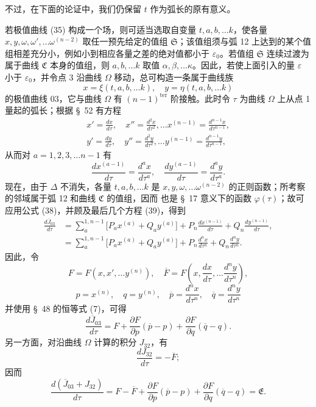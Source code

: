 \documentclass[11pt,a4paper,leqno]{article}
\begin{document}
不过，在下面的论证中，我们仍保留 $t$ 作为弧长的原有意义。

若极值曲线 (35) 构成一个场，则可适当选取自变量 $t,a,b,\ldots k$，使各量 $x,y,\omega,\omega',\ldots\omega^{(n-2)}$ 取任一预先给定的值组 $\mathfrak{S}$；该值组须与弧 12 上达到的某个值组相差充分小，例如小到相应各量之差的绝对值都小于 $\varepsilon_0$。若值组 $\mathfrak{S}$ 连续过渡为属于曲线 $\mathfrak{C}$ 本身的值组，则 $a,b,\ldots k$ 取值 $\alpha,\beta,\ldots\kappa$。因此，若使上面引入的量 $\varepsilon$ 小于 $\varepsilon_0$，并令点 3 沿曲线 $\Omega$ 移动，总可构造一条属于曲线族
\[
x=\xi(t,a,b,\ldots k),\quad y=\eta(t,a,b,\ldots k)
\]
的极值曲线 03，它与曲线 $\Omega$ 有 $(n-1)^{\mathrm{ter}}$ 阶接触。此时令 $\tau$ 为曲线 $\Omega$ 上从点 1 量起的弧长；根据 \S~52 有方程
\begin{equation}\tag{39}
\begin{gathered}
x'=\frac{dx}{d\tau},\quad x''=\frac{d^2x}{d\tau^2},\ldots
x^{(n-1)}=\frac{d^{n-1}x}{d\tau^{n-1}},\\
y'=\frac{dy}{d\tau},\quad y''=\frac{d^2y}{d\tau^2},\ldots
y^{(n-1)}=\frac{d^{n-1}y}{d\tau^{n-1}},
\end{gathered}
\end{equation}
从而对 $a=1,2,3,\ldots n-1$ 有
\[
\frac{dx^{(a-1)}}{d\tau}=\frac{d^a x}{d\tau^a},\quad
\frac{dy^{(a-1)}}{d\tau}=\frac{d^a y}{d\tau^a}.
\]
现在，由于 $\Delta$ 不消失，各量 $t,a,b,\ldots k$ 是 $x,y,\omega,\ldots\omega^{(n-2)}$ 的正则函数；所考察的邻域属于弧 12 和曲线 $\mathfrak{C}$ 的值组，因而
也是 \S~17 意义下的函数 $\varphi(\tau)$；故可应用公式 (38)，并顾及最后几个方程 (39)，得到
\[
\begin{aligned}
\frac{d\overline{J}_{03}}{d\tau}
&=\sum_a^{1,n-1}\bigl[P_ax^{(a)}+Q_ay^{(a)}\bigr]
+P_n\frac{dx^{(n-1)}}{d\tau}
+Q_n\frac{dy^{(n-1)}}{d\tau},\\
&=\sum_a^{1,n-1}\bigl[P_ax^{(a)}+Q_ay^{(a)}\bigr]
+P_n\frac{d^n x}{d\tau^n}
+Q_n\frac{d^n y}{d\tau^n}.
\end{aligned}
\]
因此，令
\[
F=F(x,x',\ldots y^{(n)}),\quad
\overline{F}=F\left(x,\frac{dx}{d\tau},\ldots\frac{d^n y}{d\tau^n}\right),
\]
\[
p=x^{(n)},\quad q=y^{(n)},\quad
\overline{p}=\frac{d^n x}{d\tau^n},\quad
\overline{q}=\frac{d^n y}{d\tau^n}
\]
并使用 \S~48 的恒等式 (7)，可得
\[
\frac{d\overline{J}_{03}}{d\tau}
=F+\frac{\partial F}{\partial p}(\overline{p}-p)
+\frac{\partial F}{\partial q}(\overline{q}-q).
\]
另一方面，对沿曲线 $\Omega$ 计算的积分 $J_{32}$，有
\[
\frac{dJ_{32}}{d\tau}=-\overline{F};
\]
因而
\begin{equation}\tag{40}
\frac{d(\overline{J}_{03}+J_{32})}{d\tau}
=F-\overline{F}+\frac{\partial F}{\partial p}(\overline{p}-p)
+\frac{\partial F}{\partial q}(\overline{q}-q)=\mathfrak{E}.
\end{equation}
\end{document}
